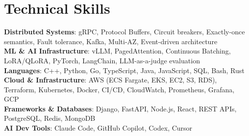 \documentclass[letterpaper,11pt]{article}
\begin{document}
\section{Technical Skills}
\vspace{-7pt}
\begin{itemize}
[leftmargin=0.15in, label={}]\small{\item{
        \textbf{Distributed Systems}{: gRPC, Protocol Buffers, Circuit breakers, Exactly-once semantics, Fault tolerance, Kafka, Multi-AZ, Event-driven architecture} \\
        \textbf{ML \& AI Infrastructure}{: vLLM, PagedAttention, Continuous Batching, LoRA/QLoRA, PyTorch, LangChain, LLM-as-a-judge evaluation} \\
        \textbf{Languages}{: C++, Python, Go, TypeScript, Java, JavaScript, SQL, Bash, Rust} \\
        \textbf{Cloud \& Infrastructure}{: AWS (ECS Fargate, EKS, EC2, S3, RDS), Terraform, Kubernetes, Docker, CI/CD, CloudWatch, Prometheus, Grafana, GCP} \\
        \textbf{Frameworks \& Databases}{: Django, FastAPI, Node.js, React, REST APIs, PostgreSQL, Redis, MongoDB} \\
        \textbf{AI Dev Tools}{: Claude Code, GitHub Copilot, Codex, Cursor} \\
}}
\end{itemize}
\end{document}
